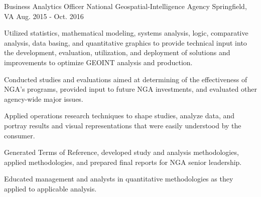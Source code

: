 \begin{cventries}
  \cventry
    {Business Analytics Officer} %
    {National Geospatial-Intelligence Agency} %
    {Springfield, VA} %
    {Aug. 2015 - Oct. 2016} %
    {
      \begin{cvitems} %
        \item {Utilized statistics, mathematical modeling, systems analysis, logic, comparative analysis, data basing, and quantitative graphics to provide technical input into the development, evaluation, utilization, and deployment of solutions and improvements to optimize GEOINT analysis and production.}
        \item {Conducted studies and evaluations aimed at determining of the effectiveness of NGA's programs, provided input to future NGA investments, and evaluated other agency-wide major issues.}
        \item {Applied operations research techniques to shape studies, analyze data, and portray results and visual representations that were easily understood by the consumer.}
        \item {Generated Terms of Reference, developed study and analysis methodologies, applied methodologies, and prepared final reports for NGA senior leadership.}
        \item {Educated management and analysts in quantitative methodologies as they applied to applicable analysis.}
      \end{cvitems}
    }


\end{cventries}
